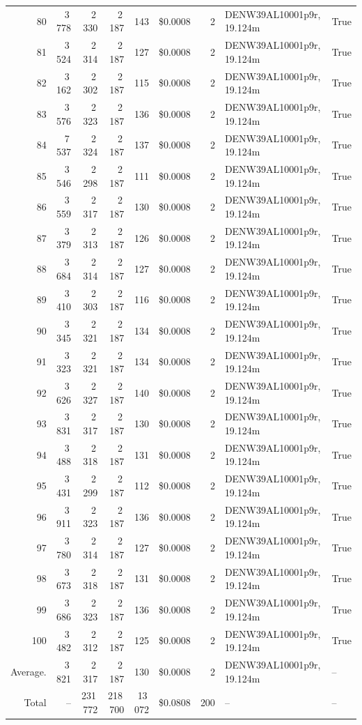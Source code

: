\documentclass[a4paper,11pt]{article}
\begin{document}
\begin{table}[ht]
\begin{tabular}{r r r r r r r p{3cm} l}
80 & 3\,778 & 2\,330 & 2\,187 & 143 & \$0.0008 & 2 & DENW39AL10001p9r, 19.124m & True \\
81 & 3\,524 & 2\,314 & 2\,187 & 127 & \$0.0008 & 2 & DENW39AL10001p9r, 19.124m & True \\
82 & 3\,162 & 2\,302 & 2\,187 & 115 & \$0.0008 & 2 & DENW39AL10001p9r, 19.124m & True \\
83 & 3\,576 & 2\,323 & 2\,187 & 136 & \$0.0008 & 2 & DENW39AL10001p9r, 19.124m & True \\
84 & 7\,537 & 2\,324 & 2\,187 & 137 & \$0.0008 & 2 & DENW39AL10001p9r, 19.124m & True \\
85 & 3\,546 & 2\,298 & 2\,187 & 111 & \$0.0008 & 2 & DENW39AL10001p9r, 19.124m & True \\
86 & 3\,559 & 2\,317 & 2\,187 & 130 & \$0.0008 & 2 & DENW39AL10001p9r, 19.124m & True \\
87 & 3\,379 & 2\,313 & 2\,187 & 126 & \$0.0008 & 2 & DENW39AL10001p9r, 19.124m & True \\
88 & 3\,684 & 2\,314 & 2\,187 & 127 & \$0.0008 & 2 & DENW39AL10001p9r, 19.124m & True \\
89 & 3\,410 & 2\,303 & 2\,187 & 116 & \$0.0008 & 2 & DENW39AL10001p9r, 19.124m & True \\
90 & 3\,345 & 2\,321 & 2\,187 & 134 & \$0.0008 & 2 & DENW39AL10001p9r, 19.124m & True \\
91 & 3\,323 & 2\,321 & 2\,187 & 134 & \$0.0008 & 2 & DENW39AL10001p9r, 19.124m & True \\
92 & 3\,626 & 2\,327 & 2\,187 & 140 & \$0.0008 & 2 & DENW39AL10001p9r, 19.124m & True \\
93 & 3\,831 & 2\,317 & 2\,187 & 130 & \$0.0008 & 2 & DENW39AL10001p9r, 19.124m & True \\
94 & 3\,488 & 2\,318 & 2\,187 & 131 & \$0.0008 & 2 & DENW39AL10001p9r, 19.124m & True \\
95 & 3\,431 & 2\,299 & 2\,187 & 112 & \$0.0008 & 2 & DENW39AL10001p9r, 19.124m & True \\
96 & 3\,911 & 2\,323 & 2\,187 & 136 & \$0.0008 & 2 & DENW39AL10001p9r, 19.124m & True \\
97 & 3\,780 & 2\,314 & 2\,187 & 127 & \$0.0008 & 2 & DENW39AL10001p9r, 19.124m & True \\
98 & 3\,673 & 2\,318 & 2\,187 & 131 & \$0.0008 & 2 & DENW39AL10001p9r, 19.124m & True \\
99 & 3\,686 & 2\,323 & 2\,187 & 136 & \$0.0008 & 2 & DENW39AL10001p9r, 19.124m & True \\
100 & 3\,482 & 2\,312 & 2\,187 & 125 & \$0.0008 & 2 & DENW39AL10001p9r, 19.124m & True \\
\hline
Average. & 3\,821 & 2\,317 & 2\,187 & 130 & \$0.0008 & 2 & DENW39AL10001p9r, 19.124m & -- \\
Total & -- & 231\,772 & 218\,700 & 13\,072 & \$0.0808 & 200 & -- & -- \\
\hline
\end{tabular}
\end{table}
\end{document}
